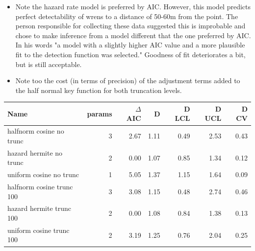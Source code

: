 \documentclass[a4paper]{article}
\begin{document}
{%
	\begin{tcolorbox}[colback=green!5!white, colframe=green!60!black, title=Remarks about analysis of the snapshot wren analysis]
	\begin{itemize}
		\item Note the hazard rate model is preferred by AIC.  However, this model predicts perfect detectability of wrens to a distance of 50-60m from the point.  The person responsible for collecting these data suggested this is improbable and chose to make inference from a model different that the one preferred by AIC.  In his words "a model with a slightly higher AIC value and a more plausible fit to the detection function was selected." Goodness of fit deteriorates a bit, but is still acceptable.
		\item Note too the cost (in terms of precision) of the adjustment terms added to the half normal key function for both truncation levels.
	\end{itemize}

{\small
\begin{tabular}{lrrrrrr}
Name                      & params & $\Delta$ AIC & D    & D LCL & D UCL & D CV \\
\hline
halfnorm cosine no trunc  & 3      & 2.67      & 1.11 & 0.49  & 2.53  & 0.43 \\
hazard hermite no trunc   & 2      & 0.00      & 1.07 & 0.85  & 1.34  & 0.12 \\
uniform cosine no trunc   & 1      & 5.05      & 1.37 & 1.15  & 1.64  & 0.09 \\
\hline
halfnorm cosine trunc 100 & 3      & 3.08      & 1.15 & 0.48  & 2.74  & 0.46 \\
hazard hermite trunc 100  & 2      & 0.00      & 1.08 & 0.84  & 1.38  & 0.13 \\
uniform cosine trunc 100  & 2      & 3.19      & 1.25 & 0.76  & 2.04  & 0.25
\end{tabular}
}
	\end{tcolorbox}

}%
{%
}

\printbibliography
\end{document}
